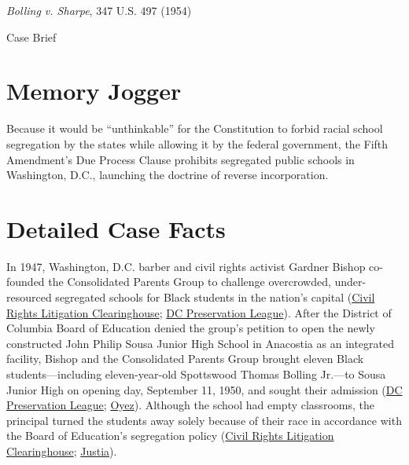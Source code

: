 \documentclass[12pt]{article}
\begin{document}
\begin{center}
{\LARGE \textit{Bolling v. Sharpe}, 347 U.S. 497 (1954)\par}
\vspace{0.8em}
{\large Case Brief\par}
\end{center}
\vspace{1em}

\section{Memory Jogger}

Because it would be ``unthinkable'' for the Constitution to forbid racial school segregation by the states while allowing it by the federal government, the Fifth Amendment's Due Process Clause prohibits segregated public schools in Washington, D.C., launching the doctrine of reverse incorporation.

\section{Detailed Case Facts}

In 1947, Washington, D.C. barber and civil rights activist Gardner Bishop co-founded the Consolidated Parents Group to challenge overcrowded, under-resourced segregated schools for Black students in the nation's capital (\href{https://clearinghouse.net/case/11110/}{Civil Rights Litigation Clearinghouse}; \href{https://historicsites.dcpreservation.org/items/show/969}{DC Preservation League}). After the District of Columbia Board of Education denied the group's petition to open the newly constructed John Philip Sousa Junior High School in Anacostia as an integrated facility, Bishop and the Consolidated Parents Group brought eleven Black students---including eleven-year-old Spottswood Thomas Bolling Jr.---to Sousa Junior High on opening day, September 11, 1950, and sought their admission (\href{https://historicsites.dcpreservation.org/items/show/969}{DC Preservation League}; \href{https://www.oyez.org/cases/1940-1955/347us497}{Oyez}). Although the school had empty classrooms, the principal turned the students away solely because of their race in accordance with the Board of Education's segregation policy (\href{https://clearinghouse.net/case/11110/}{Civil Rights Litigation Clearinghouse}; \href{https://supreme.justia.com/cases/federal/us/347/497/}{Justia}).
\end{document}
